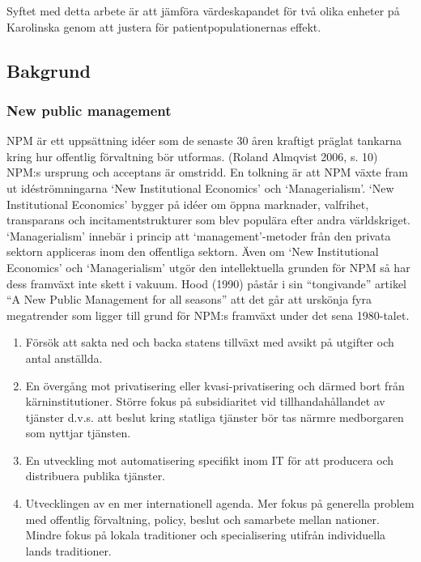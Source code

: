 Syftet med detta arbete är att jämföra värdeskapandet för två olika enheter på Karolinska genom att justera för patientpopulationernas effekt.

\subsection{Bakgrund}

\subsubsection{New public management}

NPM är ett uppsättning idéer som de senaste 30 åren kraftigt präglat tankarna kring hur offentlig förvaltning bör utformas. (Roland Almqvist 2006, s. 10) NPM:s ursprung och acceptans är omstridd. En tolkning är att NPM växte fram ut idéströmningarna ‘New Institutional Economics’ och ‘Managerialism’. ‘New Institutional Economics’ bygger på idéer om öppna marknader, valfrihet, transparans och incitamentstrukturer som blev populära efter andra världskriget. ‘Managerialism’ innebär i princip att ‘management’-metoder från den privata sektorn appliceras inom den offentliga sektorn. Även om ‘New Institutional Economics’ och ‘Managerialism’ utgör den intellektuella grunden för NPM så har dess framväxt inte skett i vakuum. Hood (1990) påstår i sin “tongivande” artikel “A New Public Management for all seasons” att det går att urskönja fyra megatrender som ligger till grund för NPM:s framväxt under det sena 1980-talet.

\begin{enumerate}
  \item Försök att sakta ned och backa statens tillväxt med avsikt på utgifter och antal anställda.
  \item En övergång mot privatisering eller kvasi-privatisering och därmed bort från kärninstitutioner. Större fokus på subsidiaritet vid tillhandahållandet av tjänster d.v.s. att beslut kring statliga tjänster bör tas närmre medborgaren som nyttjar tjänsten.
  \item En utveckling mot automatisering specifikt inom IT för att producera och distribuera publika tjänster.
  \item Utvecklingen av en mer internationell agenda. Mer fokus på generella problem med offentlig förvaltning, policy, beslut och samarbete mellan nationer. Mindre fokus på lokala traditioner och specialisering utifrån individuella lands traditioner.
\end{enumerate}


